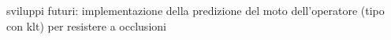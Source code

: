 

sviluppi futuri: implementazione della predizione del moto dell'operatore (tipo con klt) per resistere a occlusioni